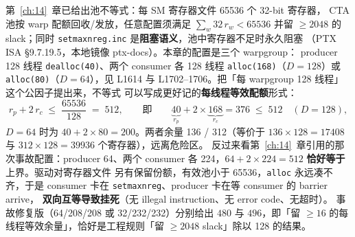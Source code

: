 第~\ref{ch:14}~章已给出池不等式：每 SM 寄存器文件 65536 个 32-bit 寄存器，
CTA 池按 warp 配额回收/发放，任意配置须满足
$\sum_{w} 32\,r_w < 65536$ 并留 $\ge 2048$ 的 slack；同时
\texttt{setmaxnreg.\allowbreak{}inc} 是\textbf{阻塞语义}，池中寄存器不足时永久阻塞
（PTX ISA §9.7.19.5，本地镜像 ptx-docs）。本章的配置是三个 warpgroup：
producer 128 线程 \texttt{dealloc(40)}、两个 consumer 各 128 线程
\texttt{alloc(168)}（$D{=}128$）或 \texttt{alloc(80)}（$D{=}64$），见
L1614 与 L1702--1706。把「每 warpgroup 128 线程」这个公因子提出来，不等式
可以写成更好记的\textbf{每线程等效配额}形式：
\begin{equation}
  r_p + 2\,r_c \;\le\; \frac{65536}{128} \;=\; 512 ,
  \qquad\text{即}\qquad
  \underbrace{40}_{r_p} + 2 \times \underbrace{168}_{r_c} = 376 \;\le\; 512
  \quad (D{=}128) ,
  \label{eq:18-pool}
\end{equation}
$D{=}64$ 时为 $40 + 2 \times 80 = 200$。两者余量 136 / 312（等价于
$136 \times 128 = 17408$ 与 $312 \times 128 = 39936$ 个寄存器），远离危险区。
反过来看第~\ref{ch:14}~章引用的那次事故配置：producer 64、两个 consumer
各 224，$64 + 2 \times 224 = 512$ \textbf{恰好等于}上界。驱动对寄存器文件
另有保留份额，有效池小于 65536，\texttt{alloc} 永远凑不齐，于是 consumer
卡在 \texttt{setmaxnreg}、producer 卡在等 consumer 的 barrier arrive，
\textbf{双向互等导致挂死}（无 illegal instruction、无 error code、无超时）。
事故修复版（64/208/208 或 32/232/232）分别给出 $480$ 与 $496$，即「留 $\ge 16$
的每线程等效余量」，恰好是工程规则「留 $\ge 2048$ slack」除以 128 的结果。

